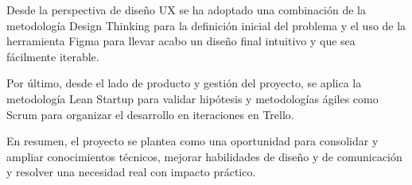 Desde la perspectiva de diseño UX se ha adoptado una combinación de la metodología Design Thinking para la definición inicial del problema y el uso de la herramienta Figma para llevar acabo un diseño final intuitivo y que sea fácilmente iterable.

Por último, desde el lado de producto y gestión del proyecto, se aplica la metodología Lean Startup para validar hipótesis y metodologías ágiles como Scrum para organizar el desarrollo en iteraciones en Trello.

En resumen, el proyecto se plantea como una oportunidad para consolidar y ampliar conocimientos técnicos, mejorar habilidades de diseño y de comunicación y resolver una necesidad real con impacto práctico.
